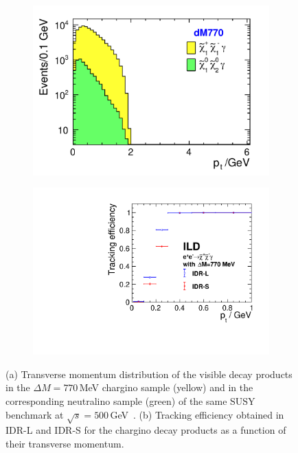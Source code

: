 \begin{figure}[htbp]
\begin{center}
\begin{subfigure}{0.525\hsize} 
\includegraphics[width=\textwidth]{Performance/fig/PT_genlevel_mh127_log.pdf}
 \caption{  \label{fig:higgsino:trkeffi:pt}}
\end{subfigure}
\begin{subfigure}{0.455\hsize} 
 \includegraphics[width=\textwidth]{Performance/fig/efficiency_higgsinos.pdf}
 \caption{ \label{fig:higgsino:trkeffi:effi}}
 \end{subfigure}
\end{center}
\caption{(a) Transverse momentum distribution of the visible decay products in the $\Delta M =770$\,MeV chargino sample (yellow) and in the corresponding neutralino sample (green) of the same SUSY benchmark at $\sqrt{s}=500$\,GeV~\cite{Berggren:2013vfa}. (b) Tracking efficiency obtained in IDR-L and IDR-S for the chargino decay products as a function of their transverse momentum.
}
\label{fig:higgsino:trkeffi}
\end{figure}


